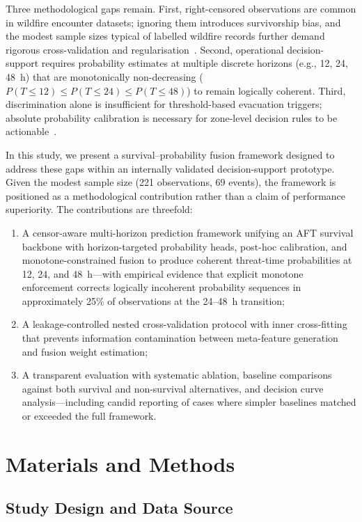 \documentclass[fire,article,submit,pdftex]{../Definitions/mdpi}
\begin{document}
Three methodological gaps remain.
First, right-censored observations are common in wildfire encounter datasets; ignoring them introduces survivorship bias, and the modest sample sizes typical of labelled wildfire records further demand rigorous cross-validation and regularisation~\cite{Steyerberg2019,Collins2024,Riley2020}.
Second, operational decision-support requires probability estimates at multiple discrete horizons (e.g., 12, 24, 48~h) that are monotonically non-decreasing ($P(T \leq 12) \leq P(T \leq 24) \leq P(T \leq 48)$) to remain logically coherent.
Third, discrimination alone is insufficient for threshold-based evacuation triggers; absolute probability calibration is necessary for zone-level decision rules to be actionable~\cite{VanCalster2019}.

In this study, we present a survival--probability fusion framework designed to address these gaps within an internally validated decision-support prototype.
Given the modest sample size (221 observations, 69 events), the framework is positioned as a methodological contribution rather than a claim of performance superiority.
The contributions are threefold:
\begin{enumerate}
    \item A censor-aware multi-horizon prediction framework unifying an AFT survival backbone with horizon-targeted probability heads, post-hoc calibration, and monotone-constrained fusion to produce coherent threat-time probabilities at 12, 24, and 48~h---with empirical evidence that explicit monotone enforcement corrects logically incoherent probability sequences in approximately 25\% of observations at the 24--48~h transition;
    \item A leakage-controlled nested cross-validation protocol with inner cross-fitting that prevents information contamination between meta-feature generation and fusion weight estimation;
    \item A transparent evaluation with systematic ablation, baseline comparisons against both survival and non-survival alternatives, and decision curve analysis---including candid reporting of cases where simpler baselines matched or exceeded the full framework.
\end{enumerate}

\section{Materials and Methods}\label{sec:methods}

\subsection{Study Design and Data Source}\label{sec:data}
\end{document}
